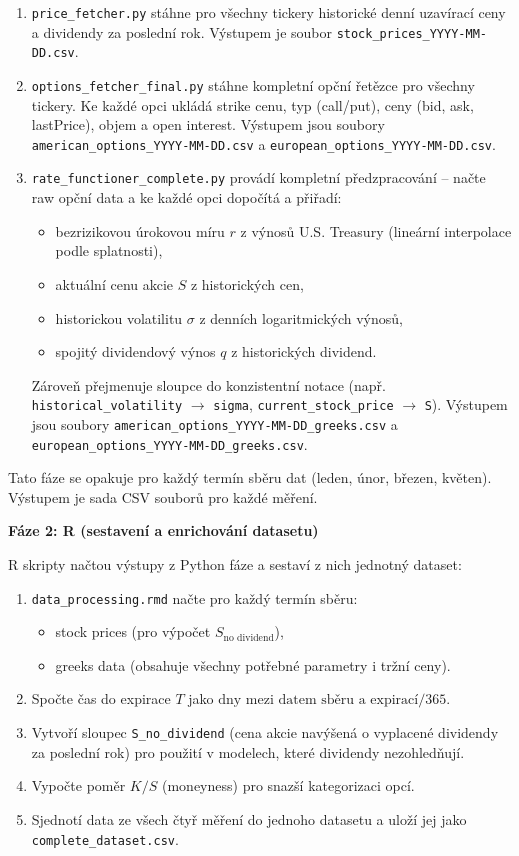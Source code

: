 \begin{enumerate}
  \item \texttt{price\_fetcher.py} stáhne pro všechny tickery historické denní uzavírací ceny a dividendy za poslední rok. Výstupem je soubor \texttt{stock\_prices\_YYYY-MM-DD.csv}.
  \item \texttt{options\_fetcher\_final.py} stáhne kompletní opční řetězce pro všechny tickery. Ke každé opci ukládá strike cenu, typ (call/put), ceny (bid, ask, lastPrice), objem a open interest. Výstupem jsou soubory \texttt{american\_options\_YYYY-MM-DD.csv} a \texttt{european\_options\_YYYY-MM-DD.csv}.
  \item \texttt{rate\_functioner\_complete.py} provádí kompletní předzpracování – načte raw opční data a ke každé opci dopočítá a přiřadí:
    \begin{itemize}
      \item bezrizikovou úrokovou míru \(r\) z výnosů U.S. Treasury (lineární interpolace podle splatnosti),
      \item aktuální cenu akcie \(S\) z historických cen,
      \item historickou volatilitu \(\sigma\) z denních logaritmických výnosů,
      \item spojitý dividendový výnos \(q\) z historických dividend.
    \end{itemize}
    Zároveň přejmenuje sloupce do konzistentní notace (např. \texttt{historical\_volatility} $\to$ \texttt{sigma}, \texttt{current\_stock\_price} $\to$ \texttt{S}). Výstupem jsou soubory \texttt{american\_options\_YYYY-MM-DD\_greeks.csv} a \texttt{european\_options\_YYYY-MM-DD\_greeks.csv}.
\end{enumerate}

Tato fáze se opakuje pro každý termín sběru dat (leden, únor, březen, květen). Výstupem je sada CSV souborů pro každé měření.

\bigskip
\noindent\textbf{Fáze 2: R (sestavení a enrichování datasetu)}

R skripty načtou výstupy z Python fáze a sestaví z nich jednotný dataset:

\begin{enumerate}
  \item \texttt{data\_processing.rmd} načte pro každý termín sběru:
    \begin{itemize}
      \item stock prices (pro výpočet \(S_{\text{no dividend}}\)),
      \item greeks data (obsahuje všechny potřebné parametry i tržní ceny).
    \end{itemize}
  \item Spočte čas do expirace \(T\) jako \(\text{dny mezi datem sběru a expirací} / 365\).
  \item Vytvoří sloupec \texttt{S\_no\_dividend} (cena akcie navýšená o vyplacené dividendy za poslední rok) pro použití v modelech, které dividendy nezohledňují.
  \item Vypočte poměr \(K/S\) (moneyness) pro snazší kategorizaci opcí.
  \item Sjednotí data ze všech čtyř měření do jednoho datasetu a uloží jej jako \texttt{complete\_dataset.csv}.
\end{enumerate}

